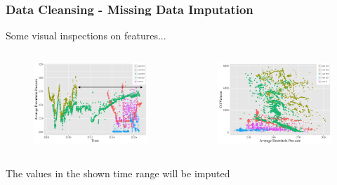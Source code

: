 \documentclass[xcolor=table]{beamer}
\begin{document}
\begin{frame}
\frametitle{Data Cleansing - Missing Data Imputation}
\begin{block}{}
Some visual inspections on features...
\end{block}
\begin{columns}[c]

\begin{figure}
\includegraphics[width=1\linewidth,left]{adp_t_copy.png} 
\end{figure}

\begin{figure}
\includegraphics[width=1\linewidth, right]{o_adp.png}
\end{figure}
\end{columns}

\begin{block}{}
The values in the shown time range will be imputed
\end{block}
\end{frame}
\end{document}

